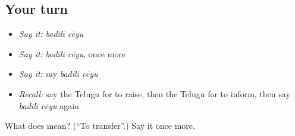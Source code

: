 \subsection*{Your turn}
\begin{itemize}
\raggedright
  \item \emph{Say it:} \emph{badilī cēyu}
  \item \emph{Say it:} \emph{badilī cēyu}, once more
  \item \emph{Say it:} say \emph{badilī cēyu}
  \item \emph{Recall:} say the Telugu for to raise, then the Telugu for to inform, then say \emph{badilī cēyu} again
\end{itemize}

\begin{tcolorbox}[breakable,colback=teal!4,colframe=teal!35!black,title={Before you move on}]
What does   mean? (\textquotedblleft{}To transfer\textquotedblright{}.) Say it once more.
\end{tcolorbox}
